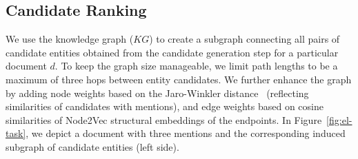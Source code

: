 \documentclass[11pt]{article}
\begin{document}
\subsection{Candidate Ranking}

We use the knowledge graph ($KG$) to create a subgraph connecting all pairs of candidate entities obtained from the candidate generation step for a particular document $d$. To keep the graph size manageable, we limit path lengths to be a maximum of three hops between entity candidates. We further enhance the graph by adding node weights based on the Jaro-Winkler distance~\cite{wang2017efficient} (reflecting similarities of candidates with mentions), and edge weights based on cosine similarities of Node2Vec \cite{grover2016node2vec} structural embeddings of the endpoints. 
In Figure~\ref{fig:el-task}, we depict a document with three mentions and the corresponding induced subgraph of candidate entities (left side).
\end{document}
